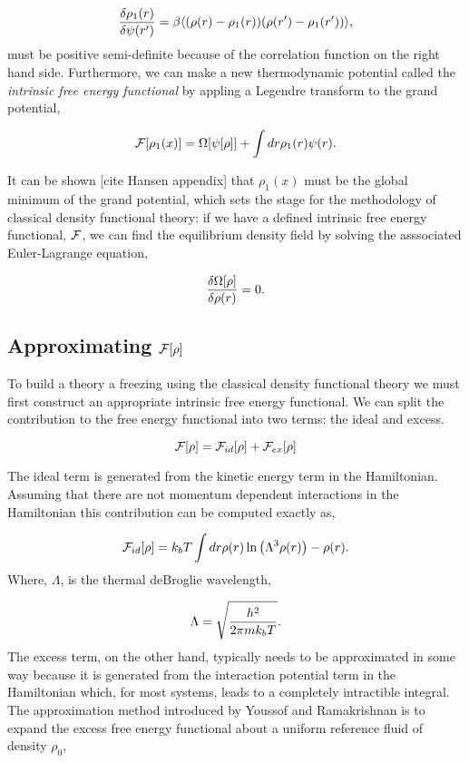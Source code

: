 \begin{equation}
    \frac{\delta \rho_1(r)}{\delta \psi(r^\prime)} = \beta \langle (\rho(r) - \rho_1(r))(\rho(r^\prime) - \rho_1(r^\prime)) \rangle, 
\end{equation}
must be positive semi-definite because of the correlation function on the right hand side. Furthermore, we can make a new thermodynamic potential called the \textit{intrinsic free energy functional} by appling a Legendre transform to the grand potential,

\begin{equation}
    \mathcal{F}[\rho_1(x)] = \Omega[\psi[\rho]] + \int dr \rho_1(r) \psi(r).
\end{equation}

It can be shown [cite Hansen appendix] that $\rho_1(x)$ must be the global minimum of the grand potential, which sets the stage for the methodology of classical density functional theory: if we have a defined intrinsic free energy functional, $\mathcal{F}$, we can find the equilibrium density field by solving the asssociated Euler-Lagrange equation, 

\begin{equation}
    \frac{\delta \Omega[\rho]}{\delta \rho(r)} = 0.
\end{equation}

\subsection{Approximating $\mathcal{F}[\rho]$}

To build a theory a freezing using the classical density functional theory we must first construct an appropriate intrinsic free energy functional. We can split the contribution to the free energy functional into two terms: the ideal and excess. 

\begin{equation}
    \mathcal{F}[\rho] = \mathcal{F}_{id}[\rho] + \mathcal{F}_{ex}[\rho]
\end{equation}

The ideal term is generated from the kinetic energy term in the Hamiltonian. Assuming that there are not momentum dependent interactions in the Hamiltonian this contribution can be computed exactly as, 

\begin{equation}
\mathcal{F}_{id}[\rho] = k_bT \int dr \rho(r) \ln\left(\Lambda^3\rho(r)\right) - \rho(r).
\end{equation}
Where, $\Lambda$, is the thermal deBroglie wavelength, 

\begin{equation}
    \Lambda = \sqrt{\frac{h^2}{2\pi m k_b T}}.
\end{equation}
The excess term, on the other hand, typically needs to be approximated in some way because it is generated from the interaction potential term in the Hamiltonian which, for most systems, leads to a completely intractible integral. The approximation method introduced by Youssof and Ramakrishnan is to expand the excess free energy functional about a uniform reference fluid of density $\rho_0$, 

